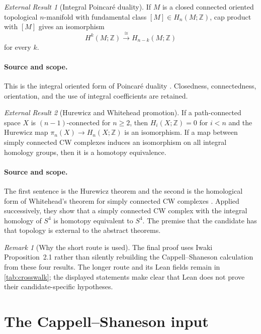 \documentclass[10pt,reqno]{amsart}
\theoremstyle{definition}
\theoremstyle{remark}
\newtheorem{remark}[theorem]{Remark}
\newtheorem{externalresult}{External Result}
\newcommand{\Z}{\mathbb Z}
\begin{document}
\begin{externalresult}[Integral Poincar\'e duality]\label{prop:PD}
If $M$ is a closed connected oriented topological $n$-manifold with
fundamental class $[M]\in H_n(M;\Z)$, cap product with $[M]$ gives an
isomorphism
\[
H^k(M;\Z)\xrightarrow{\cong}H_{n-k}(M;\Z)
\]
for every $k$.
\end{externalresult}

\paragraph{Source and scope.}
This is the integral oriented form of Poincar\'e duality
\cite[Section~3.3]{Hatcher2002}.  Closedness, connectedness, orientation, and
the use of integral coefficients are retained.

\begin{externalresult}[Hurewicz and Whitehead promotion]\label{prop:hurewicz-whitehead}
If a path-connected space $X$ is $(n-1)$-connected for $n\ge2$, then
$H_i(X;\Z)=0$ for $i<n$ and the Hurewicz map
$\pi_n(X)\to H_n(X;\Z)$ is an isomorphism.  If a map between simply connected
CW complexes induces an isomorphism on all integral homology groups, then it
is a homotopy equivalence.
\end{externalresult}

\paragraph{Source and scope.}
The first sentence is the Hurewicz theorem and the second is the homological
form of Whitehead's theorem for simply connected CW complexes
\cite[Sections~4.1--4.2]{Hatcher2002}.  Applied successively, they show that a
simply connected CW complex with the integral homology of $S^4$ is homotopy
equivalent to $S^4$.  The premise that the candidate has that topology is
external to the abstract theorems.

\begin{remark}[Why the short route is used]\label{rem:topology-tools}
The final proof uses Iwaki Proposition~2.1 rather than silently rebuilding the
Cappell--Shaneson calculation from these four results.  The longer route and
its Lean fields remain in \cref{tab:crosswalk}; the displayed statements make
clear that Lean does not prove their candidate-specific hypotheses.
\end{remark}

\section{The Cappell--Shaneson input}\label{sec:cs-input}
\end{document}
